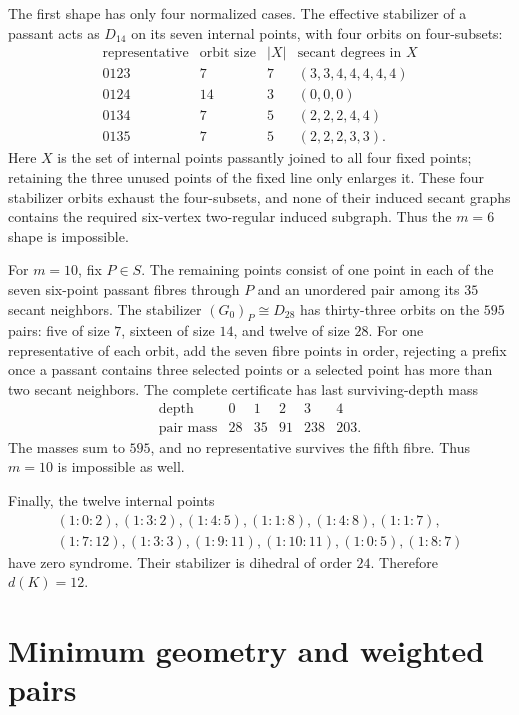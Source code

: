 \documentclass[11pt]{article}
\theoremstyle{definition}
\theoremstyle{remark}
\begin{document}
The first shape has only four normalized cases.  The effective stabilizer of
a passant acts as \(D_{14}\) on its seven internal points, with four orbits
on four-subsets:
\[
\begin{array}{c|c|c|c}
\text{representative}&\text{orbit size}&|X|&
 \text{secant degrees in }X\\ \hline
0123&7&7&(3,3,4,4,4,4,4)\\
0124&14&3&(0,0,0)\\
0134&7&5&(2,2,2,4,4)\\
0135&7&5&(2,2,2,3,3).
\end{array}
\]
Here \(X\) is the set of internal points passantly joined to all four fixed
points; retaining the three unused points of the fixed line only enlarges
it.  These four stabilizer orbits exhaust the four-subsets, and none of their
induced secant graphs contains the required six-vertex two-regular induced
subgraph.
Thus the \(m=6\) shape is impossible.

For \(m=10\), fix \(P\in S\).  The remaining points consist of one point in
each of the seven six-point passant fibres through \(P\) and an unordered
pair among its \(35\) secant neighbors.  The stabilizer
\((G_0)_P\cong D_{28}\) has thirty-three orbits on the \(595\) pairs: five of
size \(7\), sixteen of size \(14\), and twelve of size \(28\).  For one
representative of each orbit, add the seven fibre points in order, rejecting
a prefix once a passant contains three selected points or a selected point
has more than two secant neighbors.  The complete certificate has last
surviving-depth mass
\[
\begin{array}{c|rrrrr}
\text{depth}&0&1&2&3&4\\ \hline
\text{pair mass}&28&35&91&238&203.
\end{array}
\]
The masses sum to \(595\), and no representative survives the fifth fibre.
Thus \(m=10\) is impossible as well.

Finally, the twelve internal points
\[
\begin{gathered}
(1:0:2),(1:3:2),(1:4:5),(1:1:8),
(1:4:8),(1:1:7),\\
(1:7:12),(1:3:3),(1:9:11),(1:10:11),
(1:0:5),(1:8:7)
\end{gathered}
\]
have zero syndrome.  Their stabilizer is dihedral of order \(24\).
Therefore \(d(K)=12\).

\section{Minimum geometry and weighted pairs}
\label{sec:minimum-geometry}
\end{document}
